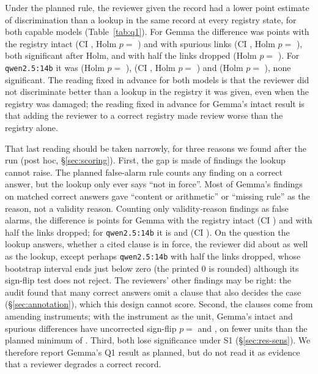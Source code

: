 Under the planned rule, the reviewer given the record had a lower point estimate of discrimination than a lookup
in the same record at every registry state, for both capable models (Table~\ref{tab:q1}). For Gemma the difference
was \DiffNetIntactGemma{} points with the registry intact (CI \CINetIntactGemma, Holm $p=$ \PHolmNetIntactGemma) and
\DiffNetSpuriousTenGemma{} with spurious links (CI \CINetSpuriousTenGemma, Holm $p=$ \PHolmNetSpuriousTenGemma),
both significant after Holm, and \DiffNetDropFiftyGemma{} with half the links dropped (Holm $p=$
\PHolmNetDropFiftyGemma). For \texttt{qwen2.5:14b} it was \DiffNetIntactQwenFourteen{} (Holm $p=$
\PHolmNetIntactQwenFourteen), \DiffNetDropFiftyQwenFourteen{} (CI \CINetDropFiftyQwenFourteen, Holm $p=$
\PHolmNetDropFiftyQwenFourteen) and \DiffNetSpuriousTenQwenFourteen{} (Holm $p=$ \PHolmNetSpuriousTenQwenFourteen),
none significant. The reading fixed in advance for both models is that the reviewer did not discriminate better than a
lookup in the registry it was given, even when the registry was damaged; the reading fixed in advance for Gemma's intact
result is that adding the reviewer to a correct registry made review worse than the registry alone.

That last reading should be taken narrowly, for three reasons we found after the run (post hoc, \S\ref{sec:scoring}).
First, the gap is made of findings the lookup cannot raise. The planned false-alarm rule counts any finding on a
correct answer, but the lookup only ever says ``not in force''. Most of Gemma's findings on matched correct answers gave
``content or arithmetic'' or ``missing rule'' as the reason, not a validity reason. Counting only validity-reason
findings as false alarms, the difference is \DiffNetVIntactGemma{} points for Gemma with the registry intact (CI
\CINetVIntactGemma) and \DiffNetVDropFiftyGemma{} with half the links dropped; for \texttt{qwen2.5:14b} it is
\DiffNetVIntactQwenFourteen{} and \DiffNetVDropFiftyQwenFourteen{} (CI \CINetVDropFiftyQwenFourteen). On the
question the lookup answers, whether a cited clause is in force, the reviewer did about as well as the lookup, except perhaps \texttt{qwen2.5:14b} with half the links dropped, whose
bootstrap interval ends just below zero (the printed 0 is rounded) although its sign-flip test does not reject. The
reviewers' other findings may be right: the audit found that many correct answers omit a clause that also decides the case
(\S\ref{sec:annotation}), which this design cannot score. Second, the \NClauses{} clauses come from
\InstrNIntactGemma{} amending instruments; with the instrument as the unit, Gemma's intact and spurious differences
have uncorrected sign-flip $p=$ \InstrPIntactGemma{} and \InstrPSpuriousTenGemma, on fewer units than the planned
minimum of \MinClauses. Third, both lose significance under S1 (\S\ref{sec:res-sens}). We therefore report Gemma's
Q1 result as planned, but do not read it as evidence that a reviewer degrades a correct record.

